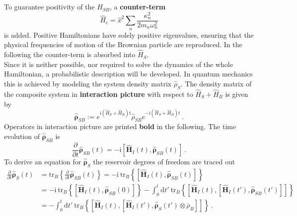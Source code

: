 	To guarantee positivity of the $\hat{H}_{SB}$, a \textbf{counter-term}
	\begin{equation}
		\hat{H}_c =	\hat{x}^2 \sum_n \frac{\kappa_n^2}{2 m_n \omega_n^2} 
	\end{equation}
	is added. Positive Hamiltonians have solely positive eigenvalues, ensuring that the physical frequencies of motion of the Brownian particle are reproduced. In the following the counter-term is absorbed into $\hat{H}_S$. \\
	
	Since it is neither possible, nor required to solve the dynamics of the whole Hamiltonian, a probabilistic description will be developed. In quantum mechanics this is achieved by modeling the system density matrix $\hat{\rho}_{S}$. The density matrix of the composite system in \textbf{interaction picture} with respect to $\hat{H}_S + \hat{H}_B$ is given by
	\begin{equation}
		\boldsymbol{\hat{\rho}}_{SB} :=	e^{\mathrm{i} \left(\hat{H}_S + \hat{H}_B\right)t} \hat{\rho}_{SB} e^{-\mathrm{i} \left(\hat{H}_S + \hat{H}_B\right)t} ~.
	\end{equation}
	 Operators in interaction picture are printed \textbf{bold} in the following. The time evolution of $\boldsymbol{\hat{\rho}}_{SB}$ is
	\begin{equation} \label{Eq::OQS-Startpoint}
		\frac{\partial}{\partial t}\boldsymbol{\hat{\rho}}_{SB}(t) =	- \mathrm{i} \left[\boldsymbol{\hat{H}}_I(t), \boldsymbol{\hat{\rho}}_{SB}(t) \right] ~.
	\end{equation}
	To derive an equation for $\boldsymbol{\hat{\rho}}_S$ the reservoir degrees of freedom are traced out
	\begin{equation} \label{Eq::Tracing-Out-Reservoir}
		\begin{split}
			\frac{\partial}{\partial t} \boldsymbol{\hat{\rho}}_S(t) &=	\text{tr}_B \left \lbrace \frac{\partial}{\partial t} \boldsymbol{\hat{\rho}}_{SB}(t) \right \rbrace =	-\mathrm{i}~\text{tr}_B \left\lbrace \left[\boldsymbol{\hat{H}}_I(t), \boldsymbol{\hat{\rho}}_{SB}(t)\right] \right\rbrace  \\
			&=	-\mathrm{i}~\text{tr}_B \left\lbrace \left[\boldsymbol{\hat{H}}_I(t), \boldsymbol{\hat{\rho}}_{SB}(0)\right] \right \rbrace - \int_{0}^{t} \text{d}t'~ \text{tr}_B \left\{  \left[\boldsymbol{\hat{H}}_I(t), \left[\boldsymbol{\hat{H}}_I(t'), \boldsymbol{\hat{\rho}}_{SB}(t') \right]\right]  \right\} \\
			&=- \int_{0}^{t} \text{d}t'~ \text{tr}_B \left\{  \left[\boldsymbol{\hat{H}}_I(t), \left[\boldsymbol{\hat{H}}_I(t'), \boldsymbol{\hat{\rho}}_S(t') \otimes \overline{\rho}_B \right]\right]  \right\}~.
		\end{split}
	\end{equation}

